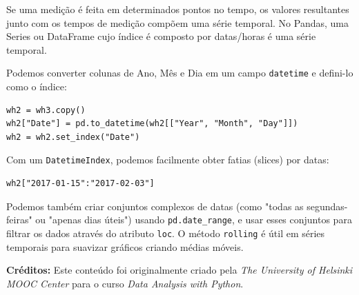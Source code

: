 \documentclass[11pt,a4paper]{article}
\begin{document}
Se uma medição é feita em determinados pontos no tempo, os valores resultantes junto com os tempos de medição compõem uma série temporal. No Pandas, uma Series ou DataFrame cujo índice é composto por datas/horas é uma série temporal.

Podemos converter colunas de Ano, Mês e Dia em um campo \texttt{datetime} e defini-lo como o índice:

\begin{lstlisting}
wh2 = wh3.copy()
wh2["Date"] = pd.to_datetime(wh2[["Year", "Month", "Day"]])
wh2 = wh2.set_index("Date")
\end{lstlisting}

Com um \texttt{DatetimeIndex}, podemos facilmente obter fatias (slices) por datas:
\begin{lstlisting}
wh2["2017-01-15":"2017-02-03"]
\end{lstlisting}

Podemos também criar conjuntos complexos de datas (como "todas as segundas-feiras" ou "apenas dias úteis") usando \texttt{pd.date\_range}, e usar esses conjuntos para filtrar os dados através do atributo \texttt{loc}. O método \texttt{rolling} é útil em séries temporais para suavizar gráficos criando médias móveis.

\vspace{2em}
\noindent\textbf{Créditos:} Este conteúdo foi originalmente criado pela \textit{The University of Helsinki MOOC Center} para o curso \textit{Data Analysis with Python}.
\end{document}
